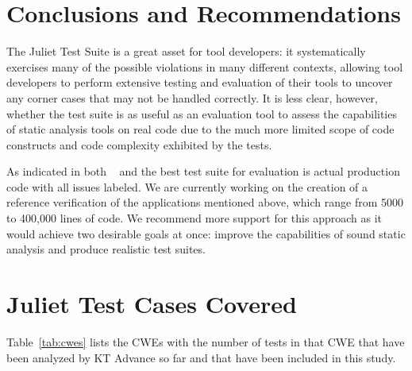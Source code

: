 \documentclass[11pt]{article}
\begin{document}
\section{Conclusions and Recommendations}
\label{sec:recs}

The Juliet Test Suite is a great asset for tool developers: it systematically exercises
many of the possible violations in many different contexts, allowing tool developers to
perform extensive testing and evaluation of their tools to uncover any corner cases 
that may not be handled correctly. It is less clear, however, whether the test suite
is as useful as an evaluation tool
to assess the capabilities of static analysis tools on real code due to the much more
limited scope of code constructs and code complexity exhibited by the tests. 

As indicated in both ~\cite{Juliet12} and \cite{NIST1995} the best test suite for
evaluation is actual production code with all issues labeled. We are currently working
on the creation of a reference verification of the applications mentioned above, which
range from 5000 to 400,000 lines of code. We recommend more support for this approach
as it would achieve two desirable goals at once: improve the capabilities of sound
static analysis and produce realistic test suites. 






\newpage

\appendix

\section{Juliet Test Cases Covered}
\label{app:tests}

Table~\ref{tab:cwes} lists the CWEs with the number of tests in that CWE
that have been analyzed by KT Advance so far and that have been included
in this study.
\end{document}
